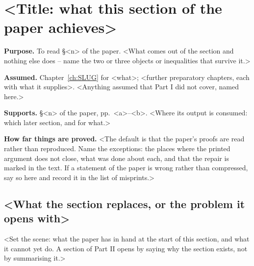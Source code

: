 %
%
\chapter{<Title: what this section of the paper achieves>}
\label{ch:read-SLUG}

\begin{chapterheader}
\textbf{Purpose.}
To read \S<n> of the paper. <What comes out of the section and nothing else
does -- name the two or three objects or inequalities that survive it.>

\medskip
\textbf{Assumed.}
Chapter~\ref{ch:SLUG} for <what>; <further preparatory chapters, each with
what it supplies>. <Anything assumed that Part I did not cover, named here.>

\medskip
\textbf{Supports.}
\S<n> of the paper, pp.~<a>--<b>. <Where its output is consumed: which later
section, and for what.>

\medskip
\textbf{How far things are proved.}
<The default is that the paper's proofs are read rather than reproduced.  Name
the exceptions: the places where the printed argument does not close, what was
done about each, and that the repair is marked in the text.  If a statement of
the paper is wrong rather than compressed, say so here and record it in the
list of misprints.>
\end{chapterheader}

\section{<What the section replaces, or the problem it opens with>}
\label{sec:read-SLUG-opening}

<Set the scene: what the paper has in hand at the start of this section, and
what it cannot yet do.  A section of Part II opens by saying why the section
exists, not by summarising it.>

